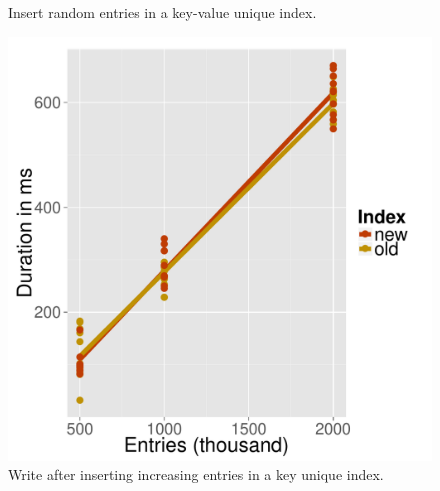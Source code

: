 \documentclass[11pt,a4paper,oneside]{article}
\begin{document}
\begin{figure}
{\begin{minipage}{0.3\textwidth}
      \caption{Insert random entries in a key-value unique index.}
      \label{fig:nonunique_random_insert}
      \end{minipage}
      \hspace{0.05\textwidth}
      \begin{minipage}{0.3\textwidth}
      \includegraphics[scale=0.30]{images/unique_increasing_write.pdf} 
      \caption{Write after inserting increasing entries in a key unique index.}
      \label{fig:unique_increasing_write}
      \end{minipage}
    }
\end{figure}
\end{document}
